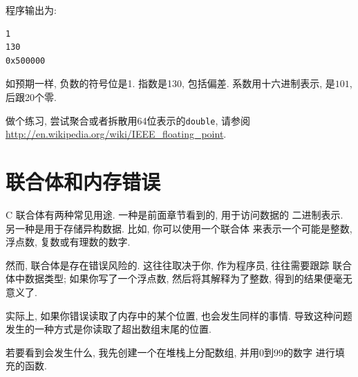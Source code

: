 \documentclass[12pt]{book}
\begin{document}
{%
程序输出为:
%
\begin{verbatim}
1
130
0x500000
\end{verbatim}
%
如预期一样, 负数的符号位是1. 指数是130, 包括偏差. 
系数用十六进制表示, 是$101$, 后跟20个零. 

做个练习, 尝试聚合或者拆散用64位表示的{\tt double}, 
请参阅\url{http://en.wikipedia.org/wiki/IEEE_floating_point}.

\section{联合体和内存错误}

C 联合体有两种常见用途. 一种是前面章节看到的, 用于访问数据的
二进制表示. 另一种是用于存储异构数据. 比如, 你可以使用一个联合体
来表示一个可能是整数, 浮点数, 复数或有理数的数字.

然而, 联合体是存在错误风险的. 这往往取决于你, 作为程序员, 往往需要跟踪
联合体中数据类型; 如果你写了一个浮点数, 然后将其解释为了整数, 
得到的结果便毫无意义了.

实际上, 如果你错误读取了内存中的某个位置, 也会发生同样的事情. 
导致这种问题发生的一种方式是你读取了超出数组末尾的位置.

若要看到会发生什么, 我先创建一个在堆栈上分配数组, 并用0到99的数字
进行填充的函数.

}
\end{document}
